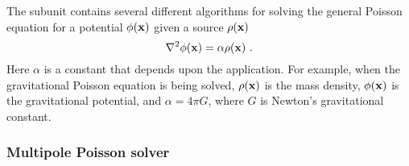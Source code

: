The  subunit contains several different algorithms
for solving the general Poisson equation for a potential $\phi({\bf
x})$ given a source $\rho({\bf x})$ 
\begin{equation}
\label{Eqn:general Poisson}
\nabla^2\phi({\bf x}) = \alpha\rho({\bf x})\ .
\end{equation}
Here $\alpha$ is a constant that depends upon the application.  For example,
when the gravitational Poisson equation is being solved, $\rho({\bf x})$ is
the mass density, $\phi({\bf x})$ is the gravitational potential, and
$\alpha = 4\pi G$, where $G$ is Newton's gravitational constant.







\subsubsection{Multipole Poisson solver }
\label{Sec:GridSolversMultipoleImproved}

